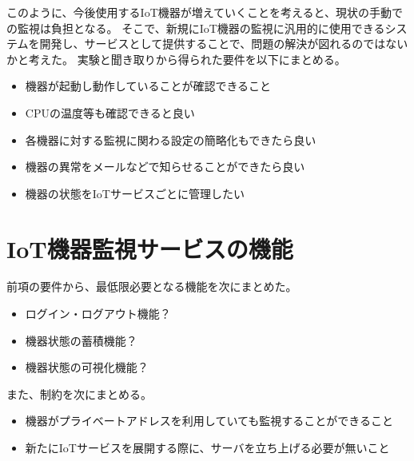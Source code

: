 このように、今後使用するIoT機器が増えていくことを考えると、現状の手動での監視は負担となる。
そこで、新規にIoT機器の監視に汎用的に使用できるシステムを開発し、サービスとして提供することで、問題の解決が図れるのではないかと考えた。
実験と聞き取りから得られた要件を以下にまとめる。
\begin{itemize}

\item 機器が起動し動作していることが確認できること
\item CPUの温度等も確認できると良い
\item 各機器に対する監視に関わる設定の簡略化もできたら良い
\item 機器の異常をメールなどで知らせることができたら良い
\item 機器の状態をIoTサービスごとに管理したい
\end{itemize}
\section{IoT機器監視サービスの機能}
前項の要件から、最低限必要となる機能を次にまとめた。
\begin{itemize}
\item ログイン・ログアウト機能？
\item 機器状態の蓄積機能？
\item 機器状態の可視化機能？
\end{itemize}
また、制約を次にまとめる。
\begin{itemize}
\item 機器がプライベートアドレスを利用していても監視することができること
\item 新たにIoTサービスを展開する際に、サーバを立ち上げる必要が無いこと
\end{itemize}



